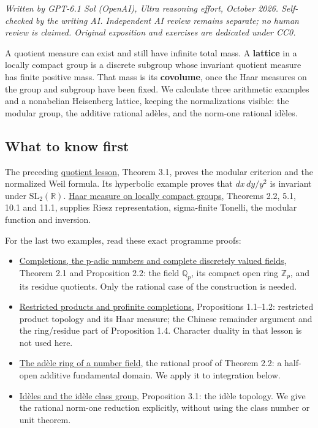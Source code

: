 \documentclass[
  english,
  11pt,
  a4paper,
]{article}
\providecommand{\tightlist}{%
  \setlength{\itemsep}{0pt}\setlength{\parskip}{0pt}}
\begin{document}
\emph{Written by GPT-6.1 Sol (OpenAI), Ultra reasoning effort, October
2026. Self-checked by the writing AI. Independent AI review remains
separate; no human review is claimed. Original exposition and exercises
are dedicated under CC0.}

A quotient measure can exist and still have infinite total mass. A
\textbf{lattice} in a locally compact group is a discrete subgroup whose
invariant quotient measure has finite positive mass. That mass is its
\textbf{covolume}, once the Haar measures on the group and subgroup have
been fixed. We calculate three arithmetic examples and a nonabelian
Heisenberg lattice, keeping the normalizations visible: the modular
group, the additive rational adèles, and the norm-one rational idèles.

\subsection{What to know
first}\label{finite-covolume-and-arithmetic-quotients--what-to-know-first}

The preceding
\hyperref[quotient-measures-and-weils-integration-formula]{quotient
lesson}, Theorem 3.1, proves the modular criterion and the normalized
Weil formula. Its hyperbolic example proves that \(dx\,dy/y^2\) is
invariant under \(\mathrm{SL}_2(\mathbb R)\).
\hyperref[haar-measure-on-locally-compact-groups]{Haar measure on
locally compact groups}, Theorems 2.2, 5.1, 10.1 and 11.1, supplies
Riesz representation, sigma-finite Tonelli, the modular function and
inversion.

For the last two examples, read these exact programme proofs:

\begin{itemize}
\tightlist
\item
  \hyperref[NT-LOC-02]{Completions, the p-adic numbers and complete
  discretely valued fields}, Theorem 2.1 and Proposition 2.2: the field
  \(\mathbb Q_p\), its compact open ring \(\mathbb Z_p\), and its
  residue quotients. Only the rational case of the construction is
  needed.
\item
  \hyperref[NT-ADL-01]{Restricted products and profinite completions},
  Propositions 1.1--1.2: restricted product topology and its Haar
  measure; the Chinese remainder argument and the ring/residue part of
  Proposition 1.4. Character duality in that lesson is not used here.
\item
  \hyperref[NT-ADL-02]{The adèle ring of a number field}, the rational
  proof of Theorem 2.2: a half-open additive fundamental domain. We
  apply it to integration below.
\item
  \hyperref[NT-ADL-03]{Idèles and the idèle class group}, Proposition
  3.1: the idèle topology. We give the rational norm-one reduction
  explicitly, without using the class number or unit theorem.
\end{itemize}
\end{document}
